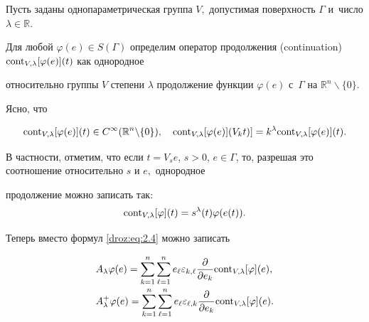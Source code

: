 \smallskip

\hypertarget{def:2.2}{}



\begin{definition}[6]Пусть заданы однопараметрическая группа $V,$ допустимая поверхность $\Gamma$ и~число $\lambda \in \mathbb R.$ 

Для любой $\varphi(e)\in S(\Gamma)$ определим оператор продолжения (continuation) ${\rm cont}_{V,\lambda}[\varphi(e)](t)$ как однородное

относительно группы $V$ степени $\lambda$ продолжение функции $\varphi(e)$ с~$\Gamma$ на $\mathbb R^n \backslash \{0\}.$

\end{definition}



\smallskip

Ясно, что

$$

{\rm cont}_{V,\lambda}[\varphi(e)](t) \in C^{\infty}(\mathbb R^n\backslash \{0\}),\quad

{\rm cont}_{V,\lambda}[\varphi(e)](V_kt)]=k^{\lambda} {\rm cont}_{V,\lambda}[\varphi(e)](t).

$$

В частности, отметим, что если $t=V_se$, $s>0$, $e \in \Gamma$, то, разрешая это соотношение относительно $s$ и $e,$ однородное

продолжение можно записать так: $${\rm cont}_{V,\lambda}[\varphi](t)=s^{\lambda}(t) \varphi(e(t)).$$ 

Теперь вместо формул \eqref{droz:eq:2.4} можно записать

\begin{equation*}


\begin{array}{l}

\displaystyle

A_{\lambda}\varphi(e)

=\sum_{k=1}^n\sum_{\ell=1}^n e_{\ell} \varepsilon_{k,\ell}

\frac{\partial}{\partial e_k}{\rm cont}_{V,\lambda}[\varphi](e), \vspace{1mm}\\

\displaystyle

A_{\lambda}^+\varphi(e)=\sum_{k=1}^n\sum_{\ell=1}^n e_{\ell}

\varepsilon_{\ell,k} \frac{\partial}{\partial e_k}{\rm cont}_{V,\lambda}[\varphi](e).

\end{array}

\end{equation*}



